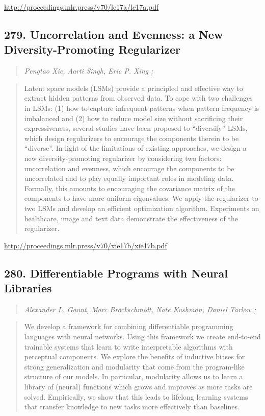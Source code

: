 \documentclass{article}
\begin{document}
\href{http://proceedings.mlr.press/v70/le17a/le17a.pdf}{http://proceedings.mlr.press/v70/le17a/le17a.pdf}

\subsection{279. Uncorrelation and Evenness: a New Diversity-Promoting Regularizer}

\begin{quote}
\footnotesize{\textit{Pengtao Xie, Aarti Singh, Eric P. Xing ;}}
\end{quote}

\begin{quote}
    Latent space models (LSMs) provide a principled and effective way to extract hidden patterns from observed data. To cope with two challenges in LSMs: (1) how to capture infrequent patterns when pattern frequency is imbalanced and (2) how to reduce model size without sacrificing their expressiveness, several studies have been proposed to “diversify” LSMs, which design regularizers to encourage the components therein to be “diverse”. In light of the limitations of existing approaches, we design a new diversity-promoting regularizer by considering two factors: uncorrelation and evenness, which encourage the components to be uncorrelated and to play equally important roles in modeling data. Formally, this amounts to encouraging the covariance matrix of the components to have more uniform eigenvalues. We apply the regularizer to two LSMs and develop an efficient optimization algorithm. Experiments on healthcare, image and text data demonstrate the effectiveness of the regularizer.  \end{quote}

\href{http://proceedings.mlr.press/v70/xie17b/xie17b.pdf}{http://proceedings.mlr.press/v70/xie17b/xie17b.pdf}

\subsection{280. Differentiable Programs with Neural Libraries}

\begin{quote}
\footnotesize{\textit{Alexander L. Gaunt, Marc Brockschmidt, Nate Kushman, Daniel Tarlow ;}}
\end{quote}

\begin{quote}
    We develop a framework for combining differentiable programming languages with neural networks. Using this framework we create end-to-end trainable systems that learn to write interpretable algorithms with perceptual components. We explore the benefits of inductive biases for strong generalization and modularity that come from the program-like structure of our models. In particular, modularity allows us to learn a library of (neural) functions which grows and improves as more tasks are solved. Empirically, we show that this leads to lifelong learning systems that transfer knowledge to new tasks more effectively than baselines.  \end{quote}
\end{document}
